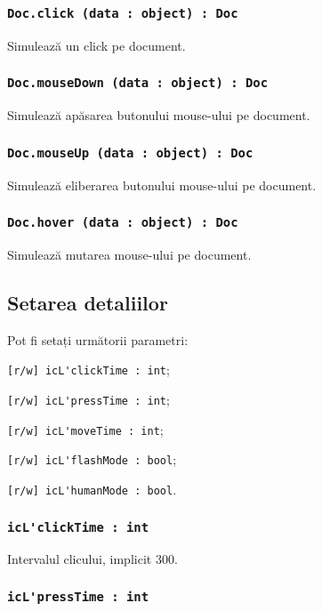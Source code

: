\subsubsection{\lstinline|Doc.click (data : object) : Doc|}

Simulează un click pe document.

\subsubsection{\lstinline|Doc.mouseDown (data : object) : Doc|}

Simulează apăsarea butonului mouse-ului pe document.

\subsubsection{\lstinline|Doc.mouseUp (data : object) : Doc|}

Simulează eliberarea butonului mouse-ului pe document.

\subsubsection{\lstinline|Doc.hover (data : object) : Doc|}

Simulează mutarea mouse-ului pe document.

\subsection{Setarea detaliilor}

Pot fi setați următorii parametri:
\begin{icItems}
	\item \lstinline|[r/w] icL'clickTime : int|;
	\item \lstinline|[r/w] icL'pressTime : int|;
	\item \lstinline|[r/w] icL'moveTime : int|;
	\item \lstinline|[r/w] icL'flashMode : bool|;
	\item \lstinline|[r/w] icL'humanMode : bool|.
\end{icItems}

\subsubsection{\lstinline|icL'clickTime : int|}

Intervalul clicului, implicit 300.

\subsubsection{\lstinline|icL'pressTime : int|}

